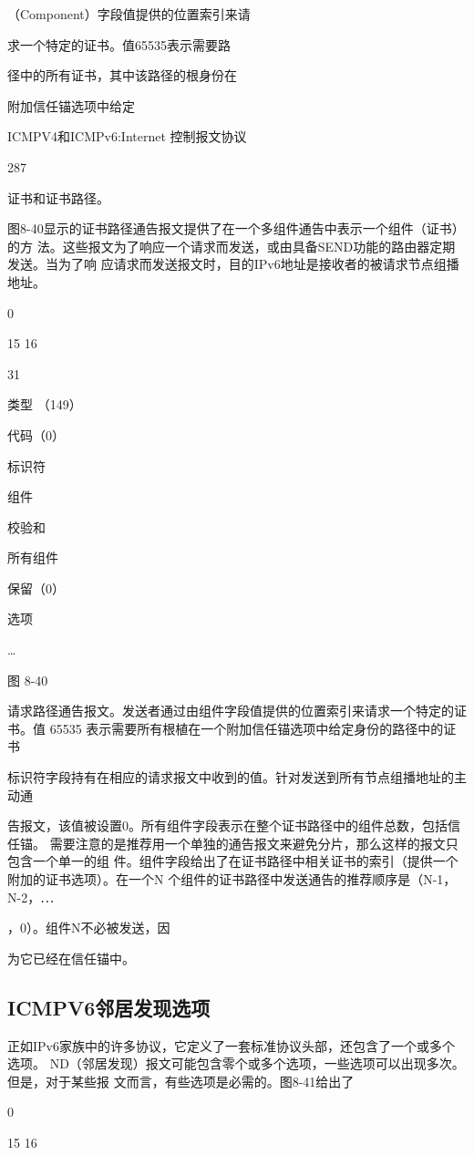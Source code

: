 （Component）字段值提供的位置索引来请

求一个特定的证书。值65535表示需要路

径中的所有证书，其中该路径的根身份在

附加信任锚选项中给定

ICMPV4和ICMPv6:Internet 控制报文协议

287

证书和证书路径。

图8-40显示的证书路径通告报文提供了在一个多组件通告中表示一个组件（证书）的方
法。这些报文为了响应一个请求而发送，或由具备SEND功能的路由器定期发送。当为了响
应请求而发送报文时，目的IPv6地址是接收者的被请求节点组播地址。

0

15 16

31

类型 （149）

代码（0）

标识符

组件

校验和

所有组件

保留（0）

选项

…

图 8-40

请求路径通告报文。发送者通过由组件字段值提供的位置索引来请求一个特定的证书。值
65535 表示需要所有根植在一个附加信任锚选项中给定身份的路径中的证书

标识符字段持有在相应的请求报文中收到的值。针对发送到所有节点组播地址的主动通

告报文，该值被设置0。所有组件字段表示在整个证书路径中的组件总数，包括信任锚。
需要注意的是推荐用一个单独的通告报文来避免分片，那么这样的报文只包含一个单一的组
件。组件字段给出了在证书路径中相关证书的索引（提供一个附加的证书选项）。在一个N
个组件的证书路径中发送通告的推荐顺序是（N-1，N-2，⋯

，0）。组件N不必被发送，因

为它已经在信任锚中。

\subsection{ICMPV6邻居发现选项}
正如IPv6家族中的许多协议，它定义了一套标准协议头部，还包含了一个或多个选项。
ND（邻居发现）报文可能包含零个或多个选项，一些选项可以出现多次。但是，对于某些报
文而言，有些选项是必需的。图8-41给出了

0

15 16

